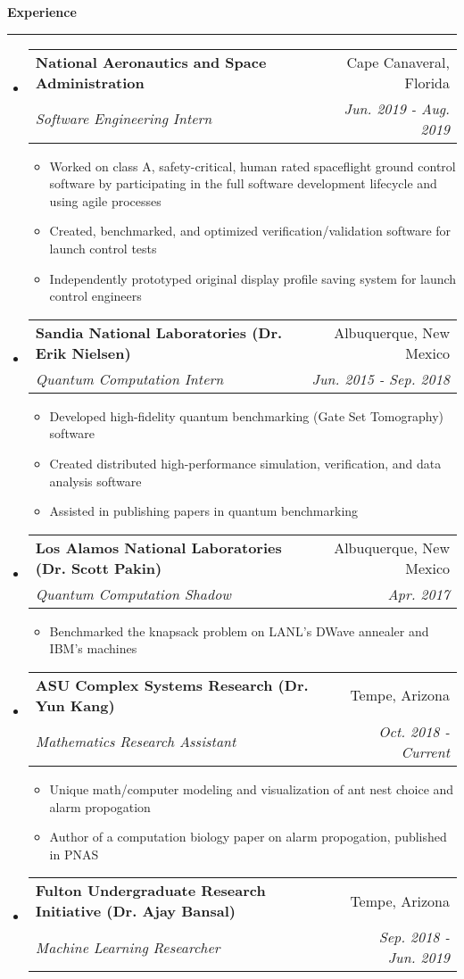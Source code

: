 \documentclass[letterpaper,11pt]{article}
\makeatletter
\newcommand{\sectionline}{
    \noindent\rule[0.5ex]{\linewidth}{0.5pt}
}
\newcommand{\resitem}[1]{\item #1 \vspace{-3pt}}
\newcommand{\resheading}[1]{
    {\large \textbf{#1}}
    \sectionline
}
\newcommand{\colfill}{@{\extracolsep{\fill}}}
\newcommand{\ressubheading}[4]{
\begin{tabular*}{6.5in}{l\colfill r}
		\textbf{#1} & #2 \\
		\textit{#3} & \textit{#4} \\
\end{tabular*}\vspace{-6pt}}
\makeatother
\begin{document}
\resheading{Experience}
\begin{itemize}
 \item
     \ressubheading{National Aeronautics and Space Administration}{Cape Canaveral, Florida}{Software Engineering Intern}{Jun. 2019 - Aug. 2019}
 	\begin{itemize}
 		\resitem{Worked on class A, safety-critical, human rated spaceflight ground control software by participating in the full software development lifecycle and using agile processes}
        \resitem{Created, benchmarked, and optimized verification/validation software for launch control tests}
 		\resitem{Independently prototyped original display profile saving system for launch control engineers}
 	\end{itemize}
 \item
    \ressubheading{Sandia National Laboratories (Dr. Erik Nielsen)}{Albuquerque, New Mexico}{Quantum Computation Intern}{Jun. 2015 - Sep. 2018}
 	\begin{itemize}
        \resitem{Developed high-fidelity quantum benchmarking (Gate Set Tomography) software}
 		\resitem{Created distributed high-performance simulation, verification, and data analysis software}
 		\resitem{Assisted in publishing papers in quantum benchmarking}
 	\end{itemize}
 \item
     \ressubheading{Los Alamos National Laboratories (Dr. Scott Pakin)}{Albuquerque, New Mexico}{Quantum Computation Shadow}{Apr. 2017}
 	\begin{itemize}
 		\resitem{Benchmarked the knapsack problem on LANL's DWave annealer and IBM's machines}
 	\end{itemize}
 \item
    \ressubheading{ASU Complex Systems Research (Dr. Yun Kang)}{Tempe, Arizona}{Mathematics Research Assistant}{Oct. 2018 - Current}
 	\begin{itemize}
 		\resitem{Unique math/computer modeling and visualization of ant nest choice and alarm propogation}
        \resitem{Author of a computation biology paper on alarm propogation, published in PNAS}
 	\end{itemize}
 \item
     \ressubheading{Fulton Undergraduate Research Initiative (Dr. Ajay Bansal)}{Tempe, Arizona}{Machine Learning Researcher}{Sep. 2018 - Jun. 2019}

\end{itemize}
\end{document}
